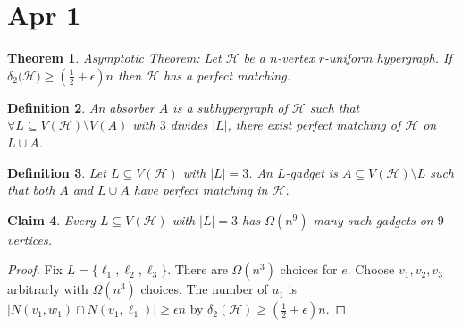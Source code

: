 \documentclass[a4paper]{article}
\newtheorem{thm}{Theorem}[section]
\newtheorem{defn}[thm]{Definition}
\newtheorem{claim}[thm]{Claim}
\begin{document}
\section{Apr 1}
\begin{thm}
    Asymptotic Theorem: Let $\mathcal{H}$ be a $n$-vertex $r$-uniform hypergraph. If $\delta_2(\mathcal{H)}\geq  \left( \frac{1}{2}+\epsilon \right)n$ then $\mathcal{H}$ has a perfect matching. 
\end{thm}
\begin{defn}
    An absorber $A$ is a subhypergraph of $\mathcal{H}$ such that $\forall L\subseteq V(\mathcal{H})\setminus V(A)$ with $3$ divides $|L|$, there exist perfect matching of $\mathcal{H}$ on $L\cup A$. 
\end{defn}
\begin{defn}
    Let $L\subseteq V(\mathcal{H})$ with $|L|=3$. An $L$-gadget is $A\subseteq V(\mathcal{H})\setminus L$ such that both $A$ and $L\cup A$ have perfect matching in $\mathcal{H}$. 
\end{defn}
\begin{claim}
    Every $L\subseteq V(\mathcal{H})$ with $|L|=3$ has $\Omega(n^9)$ many such gadgets on $9$ vertices. 
\end{claim}
\begin{proof}
    Fix $L= \{\ell_1,\ell_2,\ell_3\}$. There are $\Omega(n^3)$ choices for $e$. Choose $v_1,v_2,v_3$ arbitrarly with $\Omega(n^3)$ choices. The number of $u_1$ is $|N(v_1,w_1)\cap N(v_1,\ell_1)|\geq \epsilon n$ by $\delta_2(\mathcal{H})\geq \left( \frac{1}{2}+\epsilon \right)n$. 
\end{proof}
\end{document}
